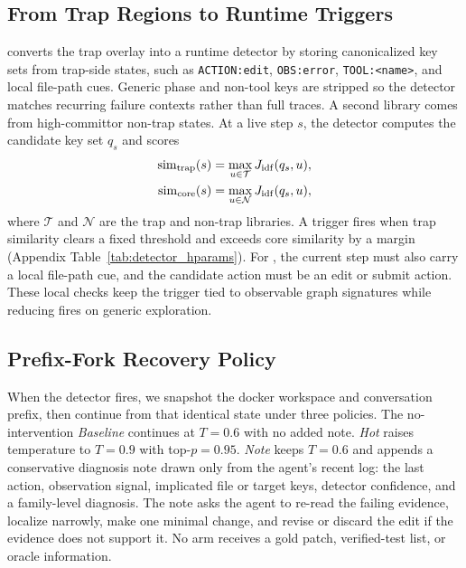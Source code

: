 \subsection{From Trap Regions to Runtime Triggers}
\label{sec:intervention_design}

\method{} converts the trap overlay into a runtime detector by storing canonicalized key sets from trap-side states, such as \texttt{ACTION:edit}, \texttt{OBS:error}, \texttt{TOOL:<name>}, and local file-path cues.
Generic phase and non-tool keys are stripped so the detector matches recurring failure contexts rather than full traces.
A second library comes from high-committor non-trap states.
At a live step $s$, the detector computes the candidate key set $q_s$ and scores
\begin{align}
\mathrm{sim}_{\mathrm{trap}}(s) &= \max_{u\in\mathcal{T}} J_{\mathrm{idf}}(q_s,u), \nonumber\\
\mathrm{sim}_{\mathrm{core}}(s) &= \max_{u\in\mathcal{N}} J_{\mathrm{idf}}(q_s,u),
\end{align}
where $\mathcal{T}$ and $\mathcal{N}$ are the trap and non-trap libraries.
A trigger fires when trap similarity clears a fixed threshold and exceeds core similarity by a margin (Appendix Table~\ref{tab:detector_hparams}).
For \swe{}, the current step must also carry a local file-path cue, and the candidate action must be an edit or submit action.
These local checks keep the trigger tied to observable graph signatures while reducing fires on generic exploration.

\subsection{Prefix-Fork Recovery Policy}
\label{sec:prefix_fork}

When the detector fires, we snapshot the docker workspace and conversation prefix, then continue from that identical state under three policies.
The no-intervention \emph{Baseline} continues at $T{=}0.6$ with no added note.
\emph{Hot} raises temperature to $T{=}0.9$ with top-$p{=}0.95$.
\emph{Note} keeps $T{=}0.6$ and appends a conservative diagnosis note drawn only from the agent's recent log: the last action, observation signal, implicated file or target keys, detector confidence, and a family-level diagnosis.
The note asks the agent to re-read the failing evidence, localize narrowly, make one minimal change, and revise or discard the edit if the evidence does not support it.
No arm receives a gold patch, verified-test list, or oracle information.

